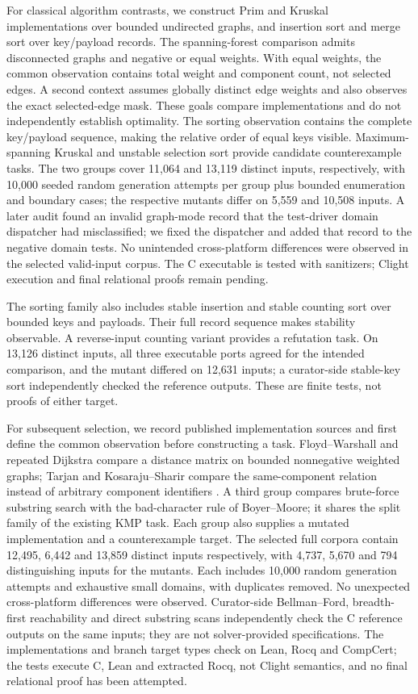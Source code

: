 \documentclass{article}
\begin{document}
For classical algorithm contrasts, we construct Prim and Kruskal implementations over bounded undirected graphs, and insertion sort and merge sort over key/payload records. The spanning-forest comparison admits disconnected graphs and negative or equal weights. With equal weights, the common observation contains total weight and component count, not selected edges. A second context assumes globally distinct edge weights and also observes the exact selected-edge mask. These goals compare implementations and do not independently establish optimality. The sorting observation contains the complete key/payload sequence, making the relative order of equal keys visible. Maximum-spanning Kruskal and unstable selection sort provide candidate counterexample tasks. The two groups cover 11,064 and 13,119 distinct inputs, respectively, with 10,000 seeded random generation attempts per group plus bounded enumeration and boundary cases; the respective mutants differ on 5,559 and 10,508 inputs. A later audit found an invalid graph-mode record that the test-driver domain dispatcher had misclassified; we fixed the dispatcher and added that record to the negative domain tests. No unintended cross-platform differences were observed in the selected valid-input corpus. The C executable is tested with sanitizers; Clight execution and final relational proofs remain pending.

The sorting family also includes stable insertion and stable counting sort over bounded keys and payloads. Their full record sequence makes stability observable. A reverse-input counting variant provides a refutation task. On 13,126 distinct inputs, all three executable ports agreed for the intended comparison, and the mutant differed on 12,631 inputs; a curator-side stable-key sort independently checked the reference outputs. These are finite tests, not proofs of either target.

For subsequent selection, we record published implementation sources and first define the common observation before constructing a task. Floyd--Warshall and repeated Dijkstra compare a distance matrix on bounded nonnegative weighted graphs; Tarjan and Kosaraju--Sharir compare the same-component relation instead of arbitrary component identifiers \citep{algs4code,algs4scc}. A third group compares brute-force substring search with the bad-character rule of Boyer--Moore; it shares the split family of the existing KMP task. Each group also supplies a mutated implementation and a counterexample target. The selected full corpora contain 12,495, 6,442 and 13,859 distinct inputs respectively, with 4,737, 5,670 and 794 distinguishing inputs for the mutants. Each includes 10,000 random generation attempts and exhaustive small domains, with duplicates removed. No unexpected cross-platform differences were observed. Curator-side Bellman--Ford, breadth-first reachability and direct substring scans independently check the C reference outputs on the same inputs; they are not solver-provided specifications. The implementations and branch target types check on Lean, Rocq and CompCert; the tests execute C, Lean and extracted Rocq, not Clight semantics, and no final relational proof has been attempted.
\end{document}
